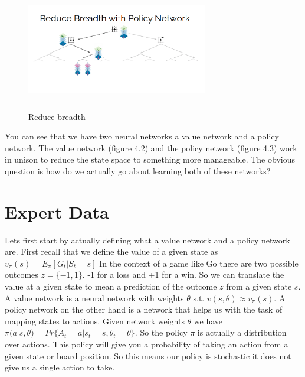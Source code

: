     \begin{figure}[h!]
       \centering
       \includegraphics[width=300px,height=200px]{images/julian_reduce_policy_network.png}
       \caption{Reduce breadth}
       \label{fig:my_label}
   \end{figure}
   
   You can see that we have two neural networks a value network and a policy network. The value network (figure 4.2) and the policy network (figure 4.3) work in unison to reduce the state space to something more manageable. The obvious question is how do we actually go about learning both of these networks? 
   
   \section{Expert Data}
   
   Lets first start by actually defining what a value network and a policy network are. First recall that we define the value of a given state as $ v_{\pi}(s) = E_{\pi}[G_{t}| S_{t} = s]$ In the context of a game like Go there are two possible outcomes $ z= \{-1,1\}$. -1 for a loss and +1 for a win. So we can translate the value at a given state to mean a prediction of the outcome $z$ from a given state $s$. A value network is a neural network with weights $ \theta $ s.t. $ v(s,\theta) \approx v_{\pi}(s)$. A policy network on the other hand is a network that helps us with the task of mapping states to actions. Given network weights $\theta$ we have $\pi(a | s, \theta) = Pr\{A_{t} = a | s_{t} = s, \theta_{t} = \theta\}$. So the policy $ \pi $ is actually a distribution over actions. This policy will give you a probability of taking an action from a given state or board position. So this means our policy is stochastic it does not give us a single action to take. 
   
